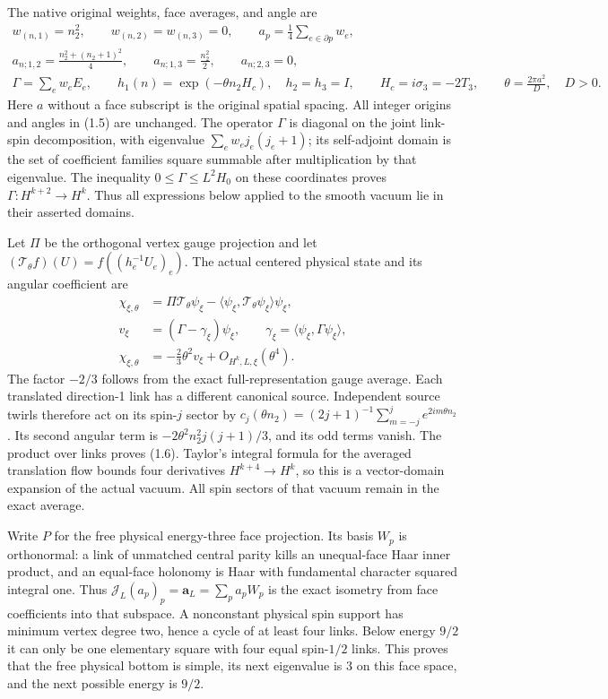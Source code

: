 \documentclass[
  11pt,
]{article}
\begin{document}
The native original weights, face averages, and angle are \[
\begin{gathered}
 w_{(n,1)}=n_2^2,\qquad w_{(n,2)}=w_{(n,3)}=0,
 \qquad a_p=\frac14\sum_{e\in\partial p}w_e,\\
 a_{n;1,2}=\frac{n_2^2+(n_2+1)^2}{4},\qquad
 a_{n;1,3}=\frac{n_2^2}{2},\qquad a_{n;2,3}=0,\\
 \Gamma=\sum_ew_eE_e,\qquad
 h_1(n)=\exp(-\theta n_2H_c),\quad h_2=h_3=I,
 \qquad H_c=i\sigma_3=-2T_3,\qquad \theta=\frac{2\pi a^2}{D},\quad D>0.
\end{gathered}
\tag{1.5}
\] Here \(a\) without a face subscript is the original spatial spacing.
All integer origins and angles in (1.5) are unchanged. The operator
\(\Gamma\) is diagonal on the joint link-spin decomposition, with
eigenvalue \(\sum_ew_ej_e(j_e+1)\); its self-adjoint domain is the set
of coefficient families square summable after multiplication by that
eigenvalue. The inequality \(0\le\Gamma\le L^2H_0\) on these coordinates
proves \(\Gamma:H^{k+2}\to H^k\). Thus all expressions below applied to
the smooth vacuum lie in their asserted domains.

Let \(\Pi\) be the orthogonal vertex gauge projection and let
\((\mathcal T_\theta f)(U)=f((h_e^{-1}U_e)_e)\). The actual centered
physical state and its angular coefficient are \[
\begin{split}
 \chi_{\xi,\theta}
  &=\Pi\mathcal T_\theta\psi_\xi
    -\langle\psi_\xi,\mathcal T_\theta\psi_\xi\rangle\psi_\xi,\\
 v_\xi&=(\Gamma-\gamma_\xi)\psi_\xi,
 \qquad\gamma_\xi=\langle\psi_\xi,\Gamma\psi_\xi\rangle,\\
 \chi_{\xi,\theta}&=-\frac23\theta^2v_\xi+O_{H^k,L,\xi}(\theta^4).
\end{split}
\tag{1.6}
\] The factor \(-2/3\) follows from the exact full-representation gauge
average. Each translated direction-1 link has a different canonical
source. Independent source twirls therefore act on its spin-\(j\) sector
by \(c_j(\theta n_2)=(2j+1)^{-1}\sum_{m=-j}^je^{2im\theta n_2}\). Its
second angular term is \(-2\theta^2n_2^2j(j+1)/3\), and its odd terms
vanish. The product over links proves (1.6). Taylor's integral formula
for the averaged translation flow bounds four derivatives
\(H^{k+4}\to H^k\), so this is a vector-domain expansion of the actual
vacuum. All spin sectors of that vacuum remain in the exact average.

Write \(P\) for the free physical energy-three face projection. Its
basis \(W_p\) is orthonormal: a link of unmatched central parity kills
an unequal-face Haar inner product, and an equal-face holonomy is Haar
with fundamental character squared integral one. Thus
\(\mathcal J_L(a_p)_p=\mathbf a_L=\sum_pa_pW_p\) is the exact isometry
from face coefficients into that subspace. A nonconstant physical spin
support has minimum vertex degree two, hence a cycle of at least four
links. Below energy \(9/2\) it can only be one elementary square with
four equal spin-\(1/2\) links. This proves that the free physical bottom
is simple, its next eigenvalue is 3 on this face space, and the next
possible energy is \(9/2\).
\end{document}
